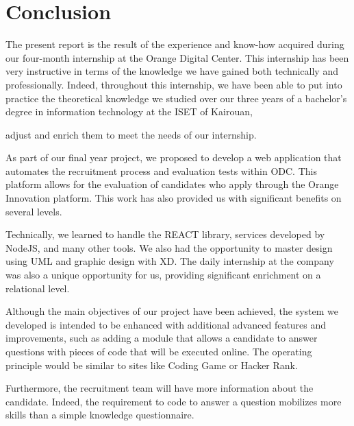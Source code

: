 \chapter*{Conclusion}
The present report is the result of the experience and know-how acquired during our four-month internship at the Orange Digital Center. 
This internship has been very instructive in terms of the knowledge we have gained both technically and professionally. 
Indeed, throughout this internship,
 we have been able to put into practice the theoretical knowledge we studied over our three years of a bachelor's degree in information technology at the ISET of Kairouan,

  adjust and enrich them to meet the needs of our internship.

As part of our final year project, we proposed to develop a web application that automates the recruitment process and evaluation tests within ODC.
 This platform allows for the evaluation of candidates who apply through the Orange Innovation platform. This work has also provided us with significant benefits on several levels.

Technically, we learned to handle the REACT library, services developed by NodeJS, 
and many other tools. We also had the opportunity to master design using UML and graphic design with XD. 
The daily internship at the company was also a unique opportunity for us,
 providing significant enrichment on a relational level.

Although the main objectives of our project have been achieved, the system we developed is intended to be enhanced with additional advanced features and improvements, such as adding a module that allows a candidate to answer questions with pieces of code that will be executed online. The operating principle would be similar to sites like Coding Game or Hacker Rank.

Furthermore, the recruitment team will have more information about the candidate. Indeed, the requirement to code to answer a question mobilizes more skills than a simple knowledge questionnaire.